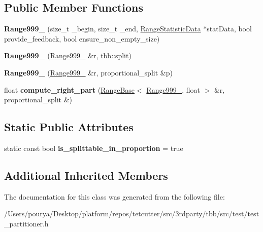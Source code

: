 \subsection*{Public Member Functions}
\begin{DoxyCompactItemize}
\item 
\hypertarget{classtest__partitioner__utils_1_1TestRanges_1_1Range999__1_a3a9fea2457369905891cd8e7203f2052}{}{\bfseries Range999\+\_} (size\+\_\+t \+\_\+begin, size\+\_\+t \+\_\+end, \hyperlink{structtest__partitioner__utils_1_1RangeStatisticData}{Range\+Statistic\+Data} $\ast$stat\+Data, bool provide\+\_\+feedback, bool ensure\+\_\+non\+\_\+empty\+\_\+size)\label{classtest__partitioner__utils_1_1TestRanges_1_1Range999__1_a3a9fea2457369905891cd8e7203f2052}

\item 
\hypertarget{classtest__partitioner__utils_1_1TestRanges_1_1Range999__1_a701d831a0b1e082638f786e8e3de8238}{}{\bfseries Range999\+\_} (\hyperlink{classtest__partitioner__utils_1_1TestRanges_1_1Range999__1}{Range999\+\_} \&r, tbb\+::split)\label{classtest__partitioner__utils_1_1TestRanges_1_1Range999__1_a701d831a0b1e082638f786e8e3de8238}

\item 
\hypertarget{classtest__partitioner__utils_1_1TestRanges_1_1Range999__1_a3919170715a5c021ba1b4e034f6f5f41}{}{\bfseries Range999\+\_} (\hyperlink{classtest__partitioner__utils_1_1TestRanges_1_1Range999__1}{Range999\+\_} \&r, proportional\+\_\+split \&p)\label{classtest__partitioner__utils_1_1TestRanges_1_1Range999__1_a3919170715a5c021ba1b4e034f6f5f41}

\item 
\hypertarget{classtest__partitioner__utils_1_1TestRanges_1_1Range999__1_a48623bccee6a35307f4f14c9e3184adc}{}float {\bfseries compute\+\_\+right\+\_\+part} (\hyperlink{classtest__partitioner__utils_1_1RangeBase}{Range\+Base}$<$ \hyperlink{classtest__partitioner__utils_1_1TestRanges_1_1Range999__1}{Range999\+\_}, float $>$ \&r, proportional\+\_\+split \&)\label{classtest__partitioner__utils_1_1TestRanges_1_1Range999__1_a48623bccee6a35307f4f14c9e3184adc}

\end{DoxyCompactItemize}
\subsection*{Static Public Attributes}
\begin{DoxyCompactItemize}
\item 
\hypertarget{classtest__partitioner__utils_1_1TestRanges_1_1Range999__1_a0d5c8492ca9a2a8ae709de6801d9f26b}{}static const bool {\bfseries is\+\_\+splittable\+\_\+in\+\_\+proportion} = true\label{classtest__partitioner__utils_1_1TestRanges_1_1Range999__1_a0d5c8492ca9a2a8ae709de6801d9f26b}

\end{DoxyCompactItemize}
\subsection*{Additional Inherited Members}


The documentation for this class was generated from the following file\+:\begin{DoxyCompactItemize}
\item 
/\+Users/pourya/\+Desktop/platform/repos/tetcutter/src/3rdparty/tbb/src/test/test\+\_\+partitioner.\+h\end{DoxyCompactItemize}
